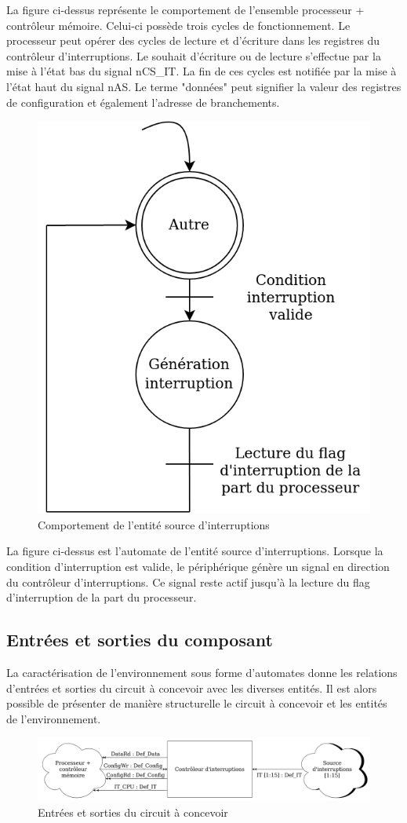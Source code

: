 La figure ci-dessus représente le comportement de l'ensemble processeur + contrôleur mémoire.
Celui-ci possède trois cycles de fonctionnement.
Le processeur peut opérer des cycles de lecture et d'écriture dans les registres du contrôleur d'interruptions.
Le souhait d'écriture ou de lecture s'effectue par la mise à l'état bas du signal nCS\_IT.
La fin de ces cycles est notifiée par la mise à l'état haut du signal nAS.
Le terme "données" peut signifier la valeur des registres de configuration et également l'adresse de branchements.\\ 


\begin{figure}[H]
	\centering
	\includegraphics[width=0.5\linewidth]{figure/spec_automate_src_int.png}
	\caption{Comportement de l'entité source d'interruptions}
	\label{fig:spec_automate_src_it}
\end{figure} 

La figure ci-dessus est l'automate de l'entité source d'interruptions.
Lorsque la condition d'interruption est valide, le périphérique génère un signal en direction du contrôleur d'interruptions.
Ce signal reste actif jusqu'à la lecture du flag d'interruption de la part du processeur.

\subsection{Entrées et sorties du composant}

La caractérisation de l'environnement sous forme d'automates donne les relations d'entrées et sorties du circuit à concevoir avec les diverses entités.
Il est alors possible de présenter de manière structurelle le circuit à concevoir et les entités de l'environnement.

\begin{figure}[H]
	\centering
	\includegraphics[width=1\linewidth]{figure/entrees_sorties_composant.png}
	\caption{Entrées et sorties du circuit à concevoir}
	\label{fig:entrees_sorties_composant}
\end{figure} 

